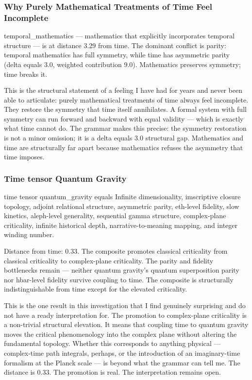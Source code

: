 \documentclass[12pt,a4paper]{article}
\begin{document}
\subsubsection{Why Purely Mathematical Treatments of Time Feel Incomplete}

temporal\_mathematics --- mathematics that explicitly incorporates temporal structure --- is at distance 3.29 from time. The dominant conflict is parity: temporal mathematics has full symmetry, while time has asymmetric parity (delta equals 3.0, weighted contribution 9.0). Mathematics preserves symmetry; time breaks it.

This is the structural statement of a feeling I have had for years and never been able to articulate: purely mathematical treatments of time always feel incomplete. They restore the symmetry that time itself annihilates. A formal system with full symmetry can run forward and backward with equal validity --- which is exactly what time cannot do. The grammar makes this precise: the symmetry restoration is not a minor omission; it is a delta equals 3.0 structural gap. Mathematics and time are structurally far apart because mathematics refuses the asymmetry that time imposes.

\subsubsection{Time tensor Quantum Gravity}

time tensor quantum\_gravity equals Infinite dimensionality, imscriptive closure topology, adjoint relational structure, asymmetric parity, eth-level fidelity, slow kinetics, aleph-level generality, sequential gamma structure, complex-plane criticality, infinite historical depth, narrative-to-meaning mapping, and integer winding number.

Distance from time: 0.33. The composite promotes classical criticality from classical criticality to complex-plane criticality. The parity and fidelity bottlenecks remain --- neither quantum gravity's quantum superposition parity nor hbar-level fidelity survive coupling to time. The composite is structurally indistinguishable from time except for the elevated criticality.

This is the one result in this investigation that I find genuinely surprising and do not have a ready interpretation for. The promotion to complex-plane criticality is a non-trivial structural elevation. It means that coupling time to quantum gravity moves the critical phenomenology into the complex plane without altering the fundamental topology. Whether this corresponds to anything physical --- complex-time path integrals, perhaps, or the introduction of an imaginary-time formalism at the Planck scale --- is beyond what the grammar can tell me. The distance is 0.33. The promotion is real. The interpretation remains open.
\end{document}
